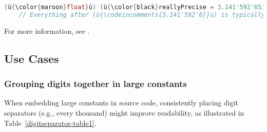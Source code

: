 \begin{lstlisting}[language=C++]
(ù{\color{maroon}float}ù) (ù{\color{black}reallyPrecise = 3.141'592'653'589'793'238'462'643'383'279'502'884;}ù)  // OK
    // Everything after (ù{\codeincomments{3.141'592'6}}ù) is typically ignored silently.
\end{lstlisting}

\noindent For more information, see .

\subsection[Use Cases]{Use Cases}\label{use-cases}

\subsubsection[Grouping digits together in large constants]{Grouping digits together in large constants}\label{grouping-digits-together-in-large-constants}

When embedding large constants in source code, consistently placing
digit separators (e.g., every thousand) might improve readability, as
illustrated in Table~\ref{digitseparator-table1}.

